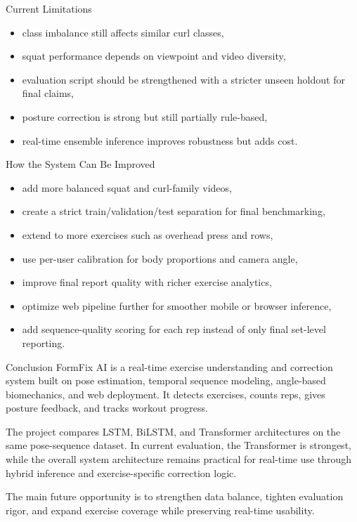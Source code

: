 \documentclass[aspectratio=169]{beamer}
\begin{document}
\begin{frame}{Current Limitations}
\begin{itemize}
  \item class imbalance still affects similar curl classes,
  \item squat performance depends on viewpoint and video diversity,
  \item evaluation script should be strengthened with a stricter unseen holdout for final claims,
  \item posture correction is strong but still partially rule-based,
  \item real-time ensemble inference improves robustness but adds cost.
\end{itemize}
\end{frame}

\begin{frame}{How the System Can Be Improved}
\begin{itemize}
  \item add more balanced squat and curl-family videos,
  \item create a strict train/validation/test separation for final benchmarking,
  \item extend to more exercises such as overhead press and rows,
  \item use per-user calibration for body proportions and camera angle,
  \item improve final report quality with richer exercise analytics,
  \item optimize web pipeline further for smoother mobile or browser inference,
  \item add sequence-quality scoring for each rep instead of only final set-level reporting.
\end{itemize}
\end{frame}

\begin{frame}{Conclusion}
\justifying
FormFix AI is a real-time exercise understanding and correction system built on pose estimation, temporal sequence modeling, angle-based biomechanics, and web deployment. It detects exercises, counts reps, gives posture feedback, and tracks workout progress.

\vspace{0.3cm}
The project compares LSTM, BiLSTM, and Transformer architectures on the same pose-sequence dataset. In current evaluation, the Transformer is strongest, while the overall system architecture remains practical for real-time use through hybrid inference and exercise-specific correction logic.

\vspace{0.3cm}
The main future opportunity is to strengthen data balance, tighten evaluation rigor, and expand exercise coverage while preserving real-time usability.
\end{frame}
\end{document}
